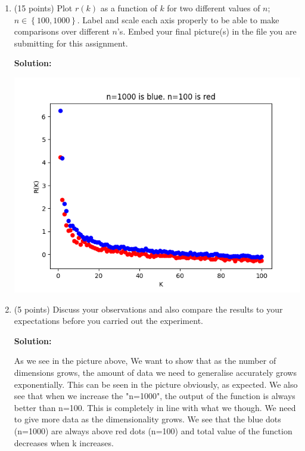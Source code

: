 \documentclass[twoside]{article}
\begin{document}
\begin{enumerate}
\item (15 points) Plot $r(k)$ as a function of $k$ for two different values of $n$; $n \in \left\{ 100, 1000 \right\}$. Label and scale each axis properly to be able to make comparisons over different $n$'s. Embed your final picture(s) in the file you are submitting for this assignment.

\textbf{Solution:}

\includegraphics[]{q8.png}

\item (5 points) Discuss your observations and also compare the results to your expectations before you carried out the experiment.

\textbf{Solution:}

As we see in the picture above, 
We want to show that as the number of dimensions grows, the amount of data we need to generalise accurately grows exponentially. This can be seen in the picture obviously, as expected. We also see that when we increase the "n=1000", the output of the function is always better than n=100. This is completely in line with what we though. We need to give more data as the dimensionality grows. We see that the blue dots (n=1000) are always above red dots (n=100) and total value of the function decreases when k increases.



\end{enumerate}


% 
\end{document}
